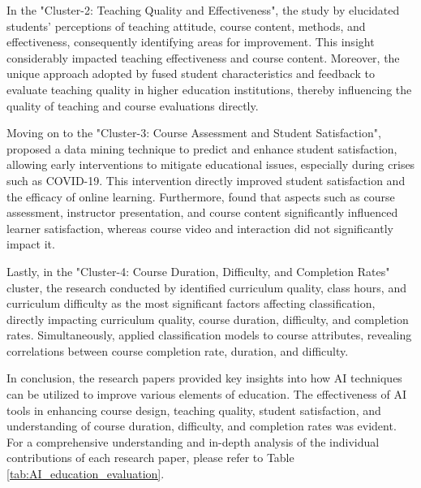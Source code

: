 \documentclass{svproc}
\begin{document}
In the "Cluster-2: Teaching Quality and Effectiveness", the study by \cite{Research_on_Project-Based_Teaching_Quality_Evaluation_Based_on_Fuzzy_Cluster_Analysis} elucidated students' perceptions of teaching attitude, course content, methods, and effectiveness, consequently identifying areas for improvement. This insight considerably impacted teaching effectiveness and course content. Moreover, the unique approach adopted by \cite{Evaluating_the_quality_of_teaching_in_higher_education_institutes_using_clustering_approach_and_set_pair_analysis} fused student characteristics and feedback to evaluate teaching quality in higher education institutions, thereby influencing the quality of teaching and course evaluations directly.

Moving on to the "Cluster-3: Course Assessment and Student Satisfaction", \cite{An_Efficient_Data_Mining_Technique_for_Assessing_Satisfaction_Level_With_Online_Learning_for_Higher_Education_Students_During_the_COVID-19} proposed a data mining technique to predict and enhance student satisfaction, allowing early interventions to mitigate educational issues, especially during crises such as COVID-19. This intervention directly improved student satisfaction and the efficacy of online learning. Furthermore, \cite{What_predicts_student_satisfaction_with_MOOCs:_A_gradient_boosting_trees_supervised_machine_learning_and_sentiment_analysis_approach} found that aspects such as course assessment, instructor presentation, and course content significantly influenced learner satisfaction, whereas course video and interaction did not significantly impact it.

Lastly, in the "Cluster-4: Course Duration, Difficulty, and Completion Rates" cluster, the research conducted by \cite{Competition_Neural_Network_Model_Application_in_the_Bilingual_Teaching_Quality_Evaluation_of_Universities} identified curriculum quality, class hours, and curriculum difficulty as the most significant factors affecting classification, directly impacting curriculum quality, course duration, difficulty, and completion rates. Simultaneously, \cite{Experience_in_learners_review_to_determine_attribute_relation_for_course_completion} applied classification models to course attributes, revealing correlations between course completion rate, duration, and difficulty.

In conclusion, the research papers provided key insights into how AI techniques can be utilized to improve various elements of education. The effectiveness of AI tools in enhancing course design, teaching quality, student satisfaction, and understanding of course duration, difficulty, and completion rates was evident. For a comprehensive understanding and in-depth analysis of the individual contributions of each research paper, please refer to Table \ref{tab:AI_education_evaluation}.
\end{document}
